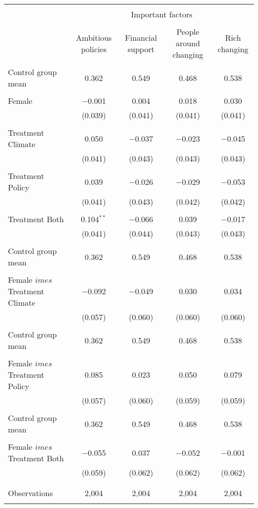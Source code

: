 
\begin{tabular}{@{\extracolsep{5pt}}lcccc} 
\\[-1.8ex]\hline 
\hline \\[-1.8ex] 
 & \multicolumn{4}{c}{Important factors} \\ 
\cline{2-5} 
\\[-1.8ex] & Ambitious policies & Financial support & People around changing & Rich changing \\ 
\hline \\[-1.8ex] 
 Control group mean & 0.362 & 0.549 & 0.468 & 0.538  \\ \hline \\[-1.8ex] Female & $-$0.001 & 0.004 & 0.018 & 0.030 \\ 
  & (0.039) & (0.041) & (0.041) & (0.041) \\ 
  & & & & \\ 
 Treatment Climate & 0.050 & $-$0.037 & $-$0.023 & $-$0.045 \\ 
  & (0.041) & (0.043) & (0.043) & (0.043) \\ 
  & & & & \\ 
 Treatment Policy & 0.039 & $-$0.026 & $-$0.029 & $-$0.053 \\ 
  & (0.041) & (0.043) & (0.042) & (0.042) \\ 
  & & & & \\ 
 Treatment Both & 0.104$^{**}$ & $-$0.066 & 0.039 & $-$0.017 \\ 
  & (0.041) & (0.044) & (0.043) & (0.043) \\ 
  & & & & \\ 
 Control group mean & 0.362 & 0.549 & 0.468 & 0.538  \\ \hline \\[-1.8ex] Female $	imes$ Treatment Climate & $-$0.092 & $-$0.049 & 0.030 & 0.034 \\ 
  & (0.057) & (0.060) & (0.060) & (0.060) \\ 
  & & & & \\ 
 Control group mean & 0.362 & 0.549 & 0.468 & 0.538  \\ \hline \\[-1.8ex] Female $	imes$ Treatment Policy & 0.085 & 0.023 & 0.050 & 0.079 \\ 
  & (0.057) & (0.060) & (0.059) & (0.059) \\ 
  & & & & \\ 
 Control group mean & 0.362 & 0.549 & 0.468 & 0.538  \\ \hline \\[-1.8ex] Female $	imes$ Treatment Both & $-$0.055 & 0.037 & $-$0.052 & $-$0.001 \\ 
  & (0.059) & (0.062) & (0.062) & (0.062) \\ 
  & & & & \\ 
\hline \\[-1.8ex] 

Observations & 2,004 & 2,004 & 2,004 & 2,004 \\ 
\hline 
\hline \\[-1.8ex] 
\end{tabular} 
